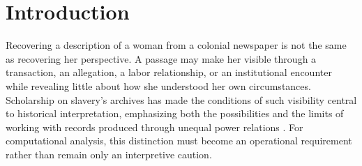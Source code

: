 \documentclass[sigconf]{acmart}
\begin{document}



\maketitle

\section{Introduction}
\label{sec:introduction}

Recovering a description of a woman from a colonial newspaper is not the same as recovering her perspective. A passage may make her visible through a transaction, an allegation, a labor relationship, or an institutional encounter while revealing little about how she understood her own circumstances. Scholarship on slavery's archives has made the conditions of such visibility central to historical interpretation, emphasizing both the possibilities and the limits of working with records produced through unequal power relations \citep{hartman2008venus,fuentes2016dispossessed}. For computational analysis, this distinction must become an operational requirement rather than remain only an interpretive caution.
\end{document}
